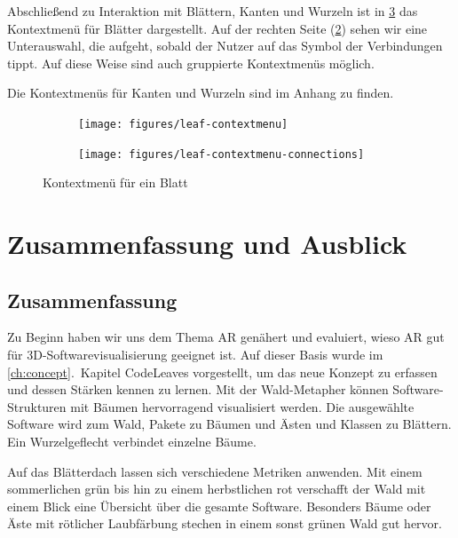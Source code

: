 \endgroup

Abschließend zu Interaktion mit Blättern, Kanten und Wurzeln ist in \ref{fig:leaf-contextmenu} das Kontextmenü für  Blätter dargestellt. Auf der rechten Seite (\ref{fig:leaf-contextmenu-connections}) sehen wir eine Unterauswahl, die aufgeht, sobald der Nutzer auf das Symbol der Verbindungen tippt. Auf diese Weise sind auch gruppierte Kontextmenüs möglich.

Die Kontextmenüs für Kanten und Wurzeln sind im Anhang zu finden.

\begin{figure}[htb]
  \centering
  \begin{subfigure}[b]{\fwidth}
    \centering
    \texttt{[image: figures/leaf-contextmenu]}
     \label{fig:leaf-contextmenu-initial}
  \end{subfigure}
  \hfill
  \begin{subfigure}[b]{\fwidth}
    \centering
  	\texttt{[image: figures/leaf-contextmenu-connections]}
  	 \label{fig:leaf-contextmenu-connections}
  \end{subfigure}
  \caption{Kontextmenü für ein Blatt} \label{fig:leaf-contextmenu}
\end{figure}

\chapter{Zusammenfassung und Ausblick}
\label{ch:conclusion}

\section{Zusammenfassung}

Zu Beginn haben wir uns dem Thema AR genähert und evaluiert, wieso AR gut für 3D-Softwarevisualisierung geeignet ist. Auf dieser Basis wurde im \ref{ch:concept}.\ Kapitel CodeLeaves vorgestellt, um das neue Konzept zu erfassen und dessen Stärken kennen zu lernen. Mit der Wald-Metapher können Software-Strukturen mit Bäumen hervorragend visualisiert werden. Die ausgewählte Software wird zum Wald, Pakete zu Bäumen und Ästen und Klassen zu Blättern. Ein Wurzelgeflecht verbindet einzelne Bäume.

Auf das Blätterdach lassen sich verschiedene Metriken anwenden. Mit einem sommerlichen grün bis hin zu einem herbstlichen rot verschafft der Wald mit einem Blick eine Übersicht über die gesamte Software. Besonders Bäume oder Äste mit rötlicher Laubfärbung stechen in einem sonst grünen Wald gut hervor.

